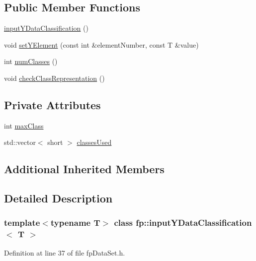 \subsection*{Public Member Functions}
\begin{DoxyCompactItemize}
\item 
\hyperlink{classfp_1_1inputYDataClassification_ab61978051d41e7a91fc778c7997a5db2}{input\+Y\+Data\+Classification} ()
\item 
void \hyperlink{classfp_1_1inputYDataClassification_a421b4107615668eebf7bf447fb99ecc5}{set\+Y\+Element} (const int \&element\+Number, const T \&value)
\item 
int \hyperlink{classfp_1_1inputYDataClassification_ade4b45e3da55233214135b6de8976297}{num\+Classes} ()
\item 
void \hyperlink{classfp_1_1inputYDataClassification_a3d75b2eec77611b51722018637b8c7e1}{check\+Class\+Representation} ()
\end{DoxyCompactItemize}
\subsection*{Private Attributes}
\begin{DoxyCompactItemize}
\item 
int \hyperlink{classfp_1_1inputYDataClassification_a5edb210f521aebaaf8d73b5c9ef68cf1}{max\+Class}
\item 
std\+::vector$<$ short $>$ \hyperlink{classfp_1_1inputYDataClassification_ad204a3c72d6b85884552f262ba9cf7fc}{classes\+Used}
\end{DoxyCompactItemize}
\subsection*{Additional Inherited Members}


\subsection{Detailed Description}
\subsubsection*{template$<$typename T$>$\newline
class fp\+::input\+Y\+Data\+Classification$<$ T $>$}



Definition at line 37 of file fp\+Data\+Set.\+h.



